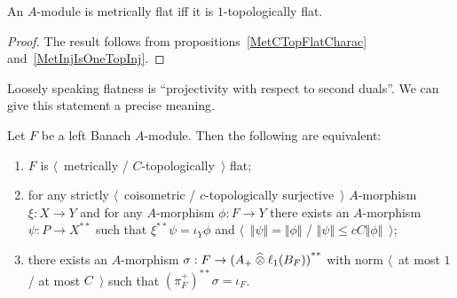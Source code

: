 \begin{proposition}\label{MetFlatIsOneTopFlat} An $A$-module is metrically flat
iff it is $1$-topologically flat.
\end{proposition}
\begin{proof} The result follows from propositions~\ref{MetCTopFlatCharac}
and~\ref{MetInjIsOneTopInj}.
\end{proof}

Loosely speaking flatness is ``projectivity with respect to second duals''. 
We can give this statement a precise meaning.

\begin{proposition}\label{MetTopFlatSecondDualCharac} Let $F$ be a left Banach
$A$-module. Then the following are equivalent:

\begin{enumerate}[label = (\roman*)]
    \item $F$ is $\langle$~metrically / $C$-topologically~$\rangle$ flat;

    \item for any strictly $\langle$~coisometric / $c$-topologically
    surjective~$\rangle$ $A$-morphism $\xi:X\to Y$ and for any $A$-morphism
    $\phi:F\to Y$ there exists an $A$-morphism $\psi:P\to X^{**}$ such that
    $\xi^{**}\psi=\iota_Y\phi$ and $\langle$~$\Vert\psi\Vert=\Vert\phi\Vert$ /
    $\Vert\psi\Vert\leq cC\Vert\phi\Vert$~$\rangle$;

    \item there exists an $A$-morphism $\sigma:F\to {(A_+\mathbin{\widehat{\otimes}}\ell_1(B_F))}^{**}$ with norm $\langle$~at most $1$ / at most $C$~$\rangle$
    such that ${(\pi_F^+)}^{**}\sigma=\iota_F$.
\end{enumerate}
\end{proposition}
